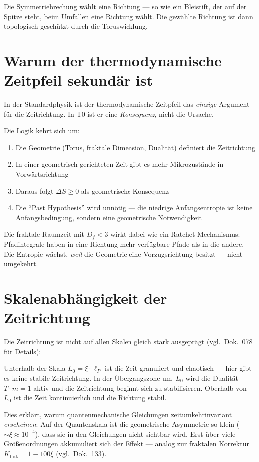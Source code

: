 Die Symmetriebrechung wählt eine Richtung --- so wie ein Bleistift, der auf der Spitze steht, beim Umfallen eine Richtung wählt. Die gewählte Richtung ist dann topologisch geschützt durch die Toruswicklung.

\section{Warum der thermodynamische Zeitpfeil sekundär ist}

In der Standardphysik ist der thermodynamische Zeitpfeil das \emph{einzige} Argument für die Zeitrichtung. In T0 ist er eine \emph{Konsequenz}, nicht die Ursache.

Die Logik kehrt sich um:
\begin{enumerate}
	\item Die Geometrie (Torus, fraktale Dimension, Dualität) definiert die Zeitrichtung
	\item In einer geometrisch gerichteten Zeit gibt es mehr Mikrozustände in Vorwärtsrichtung
	\item Daraus folgt $\Delta S \geq 0$ als geometrische Konsequenz
	\item Die ``Past Hypothesis'' wird unnötig --- die niedrige Anfangsentropie ist keine Anfangsbedingung, sondern eine geometrische Notwendigkeit
\end{enumerate}

Die fraktale Raumzeit mit $D_f < 3$ wirkt dabei wie ein Ratchet-Mechanismus: Pfadintegrale haben in eine Richtung mehr verfügbare Pfade als in die andere. Die Entropie wächst, \emph{weil} die Geometrie eine Vorzugsrichtung besitzt --- nicht umgekehrt.

\section{Skalenabhängigkeit der Zeitrichtung}

Die Zeitrichtung ist nicht auf allen Skalen gleich stark ausgeprägt (vgl.\ Dok.~078 für Details):

Unterhalb der Skala $L_0 = \xi \cdot \ell_P$ ist die Zeit granuliert und chaotisch --- hier gibt es keine stabile Zeitrichtung. In der Übergangszone um~$L_0$ wird die Dualität $T \cdot m = 1$ aktiv und die Zeitrichtung beginnt sich zu stabilisieren. Oberhalb von~$L_0$ ist die Zeit kontinuierlich und die Richtung stabil.

Dies erklärt, warum quantenmechanische Gleichungen zeitumkehrinvariant \emph{erscheinen}: Auf der Quantenskala ist die geometrische Asymmetrie so klein ($\sim \xi \approx 10^{-4}$), dass sie in den Gleichungen nicht sichtbar wird. Erst über viele Größenordnungen akkumuliert sich der Effekt --- analog zur fraktalen Korrektur $K_{\text{frak}} = 1 - 100\xi$ (vgl.\ Dok.~133).

